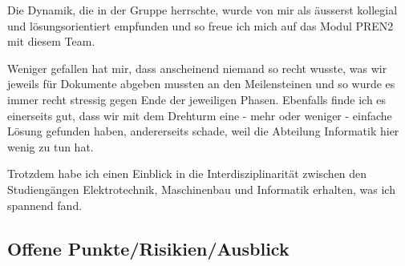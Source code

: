 Die Dynamik, die in der Gruppe herrschte, wurde von mir als äusserst kollegial und lösungsorientiert empfunden und so freue ich mich auf das Modul PREN2 mit diesem Team.

Weniger gefallen hat mir, dass anscheinend niemand so recht wusste, was wir jeweils für Dokumente abgeben mussten an den Meilensteinen und so wurde es immer recht stressig gegen Ende der jeweiligen Phasen. Ebenfalls finde ich es einerseits gut, dass wir mit dem Drehturm eine - mehr oder weniger - einfache Lösung gefunden haben, andererseits schade, weil die Abteilung Informatik hier wenig zu tun hat.

Trotzdem habe ich einen Einblick in die Interdisziplinarität zwischen den Studiengängen Elektrotechnik, Maschinenbau und Informatik erhalten, was ich spannend fand.

\subsection{Offene Punkte/Risikien/Ausblick}
